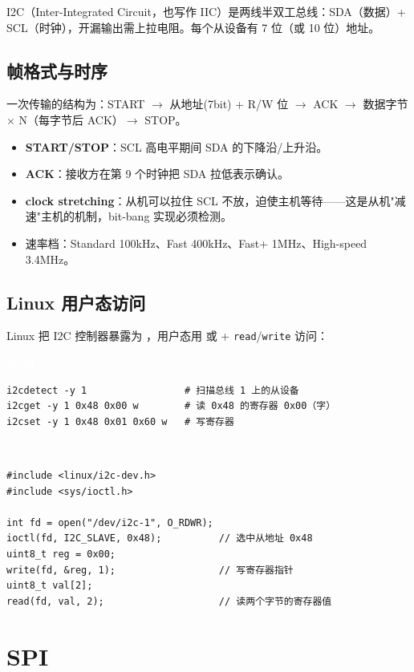 \documentclass[12pt,a4paper,fontset=fandol]{ctexbook}
\newcommand{\clabel}{%
  \begin{tcolorbox}[enhanced,colback=cheadbg,colframe=cheadbg,
    arc=1mm,boxrule=0mm,left=6pt,right=6pt,top=2pt,bottom=2pt,
    halign=left,oversize]
    \textcolor{white}{\small\bfseries C}
  \end{tcolorbox}\vspace{-4pt}}
\newcommand{\bashlabel}{%
  \begin{tcolorbox}[enhanced,colback=black!80,colframe=black!80,
    arc=1mm,boxrule=0mm,left=6pt,right=6pt,top=2pt,bottom=2pt,
    halign=left,oversize]
    \textcolor{white}{\small\bfseries Shell}
  \end{tcolorbox}\vspace{-4pt}}
\begin{document}
I2C（Inter-Integrated Circuit，也写作 IIC）是两线半双工总线：SDA（数据）+ SCL（时钟），开漏输出需上拉电阻。每个从设备有 7 位（或 10 位）地址。

\subsection{帧格式与时序}

一次传输的结构为：START $\rightarrow$ 从地址(7bit) + R/W 位 $\rightarrow$ ACK $\rightarrow$ 数据字节 $\times$ N（每字节后 ACK）$\rightarrow$ STOP。

\begin{itemize}[nosep]
  \item \textbf{START/STOP}：SCL 高电平期间 SDA 的下降沿/上升沿。
  \item \textbf{ACK}：接收方在第 9 个时钟把 SDA 拉低表示确认。
  \item \textbf{clock stretching}：从机可以拉住 SCL 不放，迫使主机等待——这是从机"减速"主机的机制，bit-bang 实现必须检测。
  \item 速率档：Standard 100kHz、Fast 400kHz、Fast+ 1MHz、High-speed 3.4MHz。
\end{itemize}

\subsection{Linux 用户态访问}

Linux 把 I2C 控制器暴露为 ，用户态用  或  + \texttt{read}/\allowbreak{}\texttt{write} 访问：

\bashlabel
\begin{lstlisting}[style=bashstyle]
i2cdetect -y 1                 # 扫描总线 1 上的从设备
i2cget -y 1 0x48 0x00 w        # 读 0x48 的寄存器 0x00（字）
i2cset -y 1 0x48 0x01 0x60 w   # 写寄存器
\end{lstlisting}

\clabel
\begin{lstlisting}[style=cstyle]
#include <linux/i2c-dev.h>
#include <sys/ioctl.h>

int fd = open("/dev/i2c-1", O_RDWR);
ioctl(fd, I2C_SLAVE, 0x48);          // 选中从地址 0x48
uint8_t reg = 0x00;
write(fd, &reg, 1);                  // 写寄存器指针
uint8_t val[2];
read(fd, val, 2);                    // 读两个字节的寄存器值
\end{lstlisting}

\section{SPI}\label{sec:spi}
\end{document}
